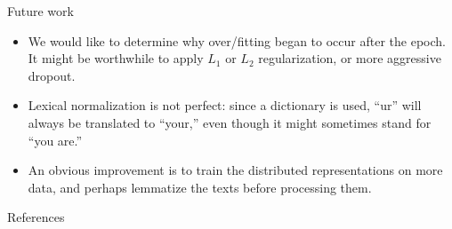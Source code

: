 \documentclass[xcolor={svgnames, table}, usepdftitle=false]{beamer}
\begin{document}
\begin{frame}{Future work}
  \begin{itemize}
  \item We would like to determine why over\-/fitting began to occur
    after the  epoch.  It might be worthwhile to apply \(L_1\)
    or \(L_2\) regularization, or more aggressive dropout.
  \item Lexical normalization is not perfect: since a dictionary is
    used, \enquote{ur} will always be translated to \enquote{your,}
    even though it might sometimes stand for \enquote{you are.}
  \item An obvious improvement is to train the distributed
    representations on more data, and perhaps lemmatize the texts
    before processing them.
  \end{itemize}
\end{frame}

\begin{frame}[t, allowframebreaks]{References}
  \printbibliography[heading=none]
\end{frame}
\end{document}
